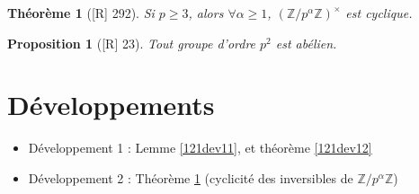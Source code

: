 \documentclass[10pt, a4paper, parskip=full, twoside, twocolumn]{report}
\newtheorem{theorem}[definition]{Théorème}
\newtheorem{proposition}[definition]{Proposition}
\newcommand{\IZ}{\mathbb{Z}}
\begin{document}
\begin{tcolorbox}[
    breakable, %
    colback=developpement, %
    colframe=gray!0!black, %
    boxrule=0pt, %
    arc=1mm, %
	boxsep=0pt,
	left=0pt, right=0pt, top=0pt, bottom=0pt
]
\begin{theorem}[\textnormal{[R] 292}]
	\label{121dev2}
	Si $p\geq 3$, alors $\forall \alpha \geq 1$, $\left(\IZ/p^{\alpha}\IZ\right)^{\times}$ est cyclique.
\end{theorem}
\end{tcolorbox}

\begin{proposition}[\textnormal{[R] 23}]
	Tout groupe d'ordre $p^2$ est abélien.
\end{proposition}

\section*{Développements}
\begin{itemize}
	\item Développement 1 : Lemme \ref{121dev11}, et théorème \ref{121dev12}
	\item Développement 2 : Théorème \ref{121dev2} (cyclicité des inversibles de $\IZ/p^{\alpha}\IZ$)
\end{itemize}
\end{document}
